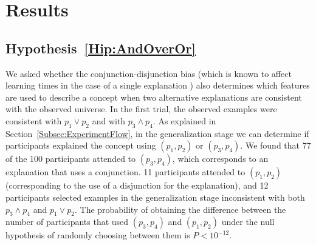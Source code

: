 







\section{Results}\label{Results}


\subsection{Hypothesis~\ref{Hip:AndOverOr}}\label{Results:AndOverOr}
We asked whether the conjunction-disjunction bias (which is known to affect learning times in the case of a single explanation \cite{bourne1970knowing}) also determines which features are used to describe a concept when two alternative explanations are consistent with the observed universe. In the first trial, the observed examples were consistent with $p_1 \vee p_2$ and with $p_3 \wedge p_4$. As explained in Section~\ref{Subsec:ExperimentFlow}, in the generalization stage we can determine if participants explained the concept using $(p_1,p_2)$ or $(p_3,p_4)$. We found that 77 of the 100 participants attended to $(p_3,p_4)$, which corresponds to an explanation that uses a conjunction. 11 participants attended to $(p_1,p_2)$ (corresponding to the use of a disjunction for the explanation), and 12 participants selected examples in the generalization stage inconsistent with both $p_3 \wedge p_4$ and $p_1 \vee p_2$. The probability of obtaining the difference between the number of participants that used $(p_3,p_4)$ and $(p_1,p_2)$ under the null hypothesis of randomly choosing between them is $P<10^{-12}$. 

